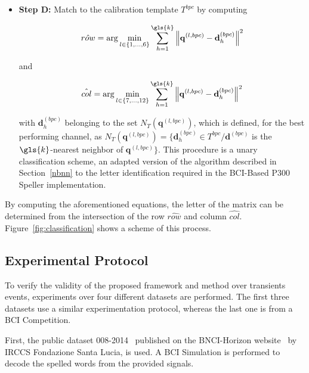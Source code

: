 \begin{itemize}

\item \textbf{Step D:} Match to the calibration template $T^{bpc}$ by computing  

\begin{equation}
\hat{row} = \arg \min_{l \in \{1,\dots,6\}} \sum_{h=1}^{\gls{k}}  {\left\lVert \mathbf{q}^{(l,bpc)} -  \mathbf{d}_{h}^{(bpc)} \right\rVert}  ^{2}
\label{eq:multiclassificationrow}
\end{equation}

\noindent and

\begin{equation}
\hat{col} = \arg \min_{l \in \{7,\dots,12\}} \sum_{h=1}^{\gls{k}}  {\left\lVert \mathbf{q}^{(l,bpc)} -  \mathbf{d}_{h}^{(bpc)} \right\rVert}  ^{2}
\label{eq:multiclassificationcol}
\end{equation}

\noindent with $\mathbf{d}_{h}^{(bpc)}$ belonging to the set $N_T( \mathbf{q}^{(l,bpc)}  )$, which is defined, for the best performing channel,  as $N_T(\mathbf{q}^{(l,bpc)} ) = \{ \mathbf{d}_{h}^{(bpc)} \in T^{bpc} /  \mathbf{d}^{(bpc)} $  is the $\gls{k}$-nearest neighbor of $ \mathbf{q}^{(l,bpc)} \}$.  This procedure is a unary classification scheme, an adapted version of the algorithm described in Section~\ref{nbnn} to the letter identification required in the BCI-Based P300 Speller implementation.

\end{itemize}
By computing the aforementioned equations, the letter of the matrix can be determined from the intersection of the row $ \hat{row} $ and column $ \hat{col} $. 
Figure~\ref{fig:classification} shows a scheme of this process. 


\subsection{Experimental Protocol} \label{Protocol}


To verify the validity of the proposed framework and method over transients events, experiments over four different datasets are performed.  The first three datasets use a similar experimentation protocol, whereas the last one is from a BCI Competition.

First, the public dataset 008-2014~\cite{Riccio2013} published on the BNCI-Horizon website~\cite{Brunner2014} by  IRCCS Fondazione Santa Lucia, is used. A BCI Simulation is performed to decode the spelled words from the provided signals.

